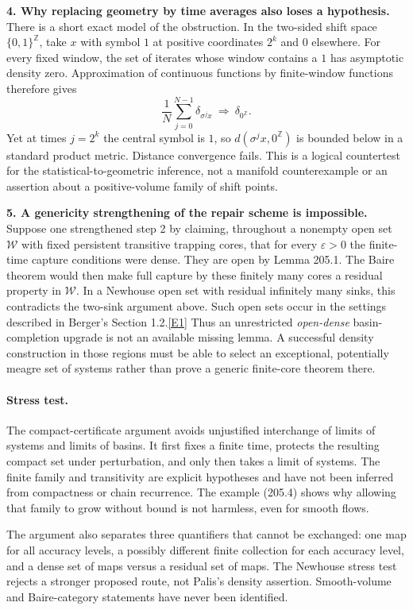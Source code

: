 \documentclass[11pt,a4paper]{article}
\newcommand{\Z}{\mathbb{Z}}
\newcommand{\eref}[2]{\hyperlink{extra:#1:#2}{[E#2]}}
\begin{document}
\textbf{4. Why replacing geometry by time averages also loses a hypothesis.}
There is a short exact model of the obstruction. In the two-sided shift
space $\{0,1\}^{\Z}$, take $x$ with symbol $1$ at positive coordinates
$2^k$ and $0$ elsewhere. For every fixed window, the set of iterates
whose window contains a $1$ has asymptotic density zero. Approximation
of continuous functions by finite-window functions therefore gives
\[
 \frac1N\sum_{j=0}^{N-1}\delta_{\sigma^j x}
 \ \Longrightarrow\ \delta_{0^{\Z}}.
\]
Yet at times $j=2^k$ the central symbol is $1$, so
$d(\sigma^j x,0^{\Z})$ is bounded below in a standard product metric.
Distance convergence fails. This is a logical countertest for the
statistical-to-geometric inference, not a manifold counterexample or
an assertion about a positive-volume family of shift points.

\textbf{5. A genericity strengthening of the repair scheme is impossible.}
Suppose one strengthened step 2 by claiming, throughout a nonempty open
set $\mathcal W$ with fixed persistent transitive trapping cores, that
for every $\varepsilon>0$ the finite-time capture conditions were dense.
They are open by Lemma 205.1. The Baire theorem would then make full
capture by these finitely many cores a residual property in
$\mathcal W$. In a Newhouse open set with residual infinitely many sinks,
this contradicts the two-sink argument above. Such open sets occur in
the settings described in Berger's Section 1.2.\eref{3433}{1}
Thus an unrestricted \emph{open-dense} basin-completion upgrade is not
an available missing lemma. A successful density construction in those
regions must be able to select an exceptional, potentially meagre set
of systems rather than prove a generic finite-core theorem there.

\paragraph{Stress test.}
The compact-certificate argument avoids unjustified interchange of
limits of systems and limits of basins. It first fixes a finite time,
protects the resulting compact set under perturbation, and only then
takes a limit of systems. The finite family and transitivity are explicit
hypotheses and have not been inferred from compactness or chain
recurrence. The example (205.4) shows why allowing that family to grow
without bound is not harmless, even for smooth flows.

The argument also separates three quantifiers that cannot be exchanged:
one map for all accuracy levels, a possibly different finite collection
for each accuracy level, and a dense set of maps versus a residual set
of maps. The Newhouse stress test rejects a stronger proposed route,
not Palis's density assertion. Smooth-volume and Baire-category
statements have never been identified.
\end{document}
